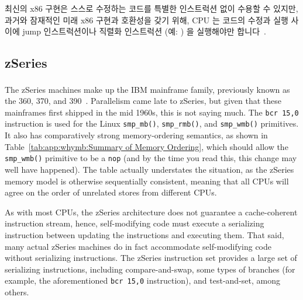 최신의 x86 구현은 스스로 수정하는 코드를 특별한 인스트럭션 없이 수용할 수
있지만, 과거와 잠재적인 미래 x86 구현과 호환성을 갖기 위해, CPU 는 코드의
수정과 실행 사이에 jump 인스트럭션이나 직렬화 인스트럭션 (예: ) 을
실행해야만 합니다~\cite[Section 8.1.3]{Intel64IA32v3A2011}.

\subsection{zSeries}

The zSeries machines make up the IBM\textsuperscript{\texttrademark}
mainframe family, previously
known as the 360, 370, and 390~\cite{IBMzSeries04a}.
Parallelism came late to zSeries, but given that these mainframes first
shipped in the mid 1960s, this is not saying much.
The {\tt bcr 15,0} instruction is used for the Linux {\tt smp\_mb()},
{\tt smp\_rmb()}, and {\tt smp\_wmb()} primitives.
It also has comparatively strong memory-ordering semantics, as shown in
Table~\ref{tab:app:whymb:Summary of Memory Ordering}, which should allow the
{\tt smp\_wmb()} primitive to be a {\tt nop} (and by the time you read this,
this change may well have happened).
The table actually understates the situation, as the zSeries memory model
is otherwise sequentially consistent, meaning that all CPUs
will agree on the order of unrelated stores from different CPUs.

As with most CPUs, the zSeries architecture does not guarantee a
cache-coherent instruction stream, hence,
self-modifying code must execute a serializing instruction between updating
the instructions and executing them.
That said, many actual zSeries machines do in fact accommodate self-modifying
code without serializing instructions.
The zSeries instruction set provides a large set of serializing instructions,
including compare-and-swap, some types of branches (for example, the
aforementioned {\tt bcr 15,0} instruction), and test-and-set,
among others.

